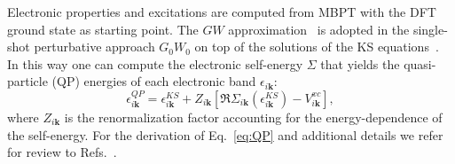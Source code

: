 \documentclass[aps,pra,superscriptaddress,twocolumn]{revtex4}
\begin{document}
Electronic properties and excitations are computed from MBPT with the DFT ground state as starting point.
The $GW$ approximation~\cite{hedi65pr} is adopted in the single-shot perturbative approach $G_0W_0$ on top of the solutions of the KS equations~\cite{hybe-loui85prl}. 
In this way one can compute the electronic self-energy $\Sigma$ that yields the quasi-particle (QP) energies of each electronic band $\epsilon_{i\mathbf{k}}$:
%
\begin{equation}
\epsilon_{i\mathbf{k}}^{QP} = \epsilon_{i\mathbf{k}}^{KS} + Z_{i\mathbf{k}} \left[ \Re \Sigma_{i\mathbf{k}}(\epsilon_{i\mathbf{k}}^{KS}) - V^{xc}_{i\mathbf{k}} \right],
\label{eq:QP}
\end{equation}
%
where $Z_{i\mathbf{k}}$ is the renormalization factor accounting for the energy-dependence of the self-energy.
For the derivation of Eq.~\eqref{eq:QP} and additional details we refer for review to Refs.~\cite{arya-gurn98rpp,onid+02rmp}.
\end{document}

